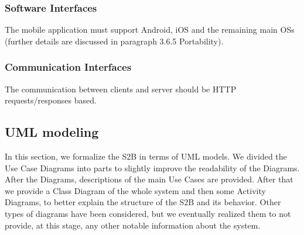 	\subsubsection{Software Interfaces}
	The mobile application must support Android, iOS and the remaining main OSs (further details are discussed in paragraph 3.6.5 Portability).
	\subsubsection{Communication Interfaces}
	The communication between clients and server should be HTTP requests/responses based.
\subsection{UML modeling}
	In this section, we formalize the S2B in terms of UML models.\newline
	We divided the Use Case Diagrams into parts to slightly improve the readability of the Diagrams. After the Diagrams, descriptions of the main Use Cases are provided.\newline
	After that we provide a Class Diagram of the whole system and then some Activity Diagrams, to better explain the structure of the S2B and its behavior.\newline
	Other types of diagrams have been considered, but we eventually realized them to not provide, at this stage, any other notable information about the system.
